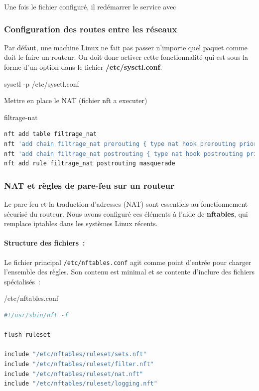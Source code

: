 \documentclass{article}
\begin{document}
Une fois le fichier configuré, il redémarrer le service avec 

\subsubsection{Configuration des routes entre les réseaux}
Par défaut, une machine Linux ne fait pas passer n'importe quel paquet  comme doit le faire un routeur. On doit donc activer cette fonctionnalité qui est sous la forme d'un option dans le fichier \textbf{/etc/sysctl.conf}.

\begin{command}
    sysctl -p /etc/sysctl.conf
\end{command}

Mettre en place le NAT (fichier nft a executer) 
\begin{codebox}{filtrage-nat}
\begin{lstlisting}[language=Bash]
nft add table filtrage_nat
nft 'add chain filtrage_nat prerouting { type nat hook prerouting priority 0 ; }'
nft 'add chain filtrage_nat postrouting { type nat hook postrouting priority 0 ; }'
nft add rule filtrage_nat postrouting masquerade
\end{lstlisting}
\end{codebox}

\subsubsection{NAT et règles de pare-feu sur un routeur}

Le pare-feu et la traduction d’adresses (NAT) sont essentiels au fonctionnement sécurisé du routeur. Nous avons configuré ces éléments à l’aide de \textbf{nftables}, qui remplace iptables dans les systèmes Linux récents.

\paragraph{Structure des fichiers~:}

Le fichier principal \texttt{/etc/nftables.conf} agit comme point d’entrée pour charger l’ensemble des règles. Son contenu est minimal et se contente d’inclure des fichiers spécialisés~:

\begin{configbox}{/etc/nftables.conf}
\begin{lstlisting}[language=bash]
#!/usr/sbin/nft -f

flush ruleset

include "/etc/nftables/ruleset/sets.nft"
include "/etc/nftables/ruleset/filter.nft"
include "/etc/nftables/ruleset/nat.nft"
include "/etc/nftables/ruleset/logging.nft"
\end{lstlisting}
\end{configbox}
\end{document}
